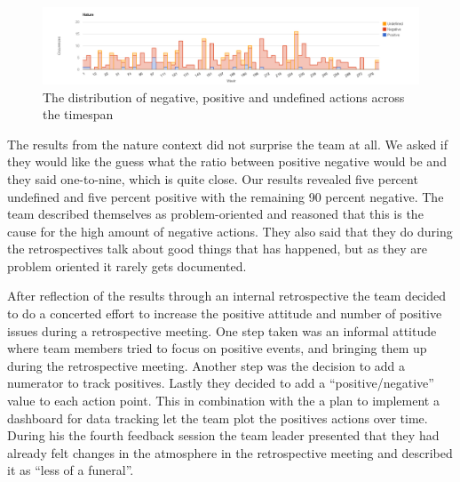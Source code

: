 \begin{table}[!h]
	\begin{center}
	\caption{Analysis results from the content analysis for the nature of the action.}
	\label{table:nature-results}
	\end{center}
\end{table}

\begin{figure}
	\centering
	\includegraphics[width=\textwidth, keepaspectratio]{figures/nature-l.png}
	\caption{The distribution of negative, positive and undefined actions across the timespan}
	\label{figure:nature-l}
\end{figure}

The results from the nature context did not surprise the team at all. We asked if they would like the guess what the ratio between positive negative would be and they said one-to-nine, which is quite close. Our results revealed five percent undefined and five percent positive with the remaining 90 percent negative. The team described themselves as problem-oriented and reasoned that this is the cause for the high amount of negative actions. They also said that they do during the retrospectives talk about good things that has happened, but as they are problem oriented it rarely gets documented. 

After reflection of the results through an internal retrospective the team decided to do a concerted effort to increase the positive attitude and number of positive issues during a retrospective meeting. One step taken was an informal attitude where team members tried to focus on positive events, and bringing them up during the retrospective meeting. Another step was the decision to add a numerator to track positives. Lastly they decided to add a ``positive/negative'' value to each action point. This in combination with the a plan to implement a dashboard for data tracking let the team plot the positives actions over time. During his the fourth feedback session the team leader presented that they had already felt changes in the atmosphere in the retrospective meeting and described it as ``less of a funeral''. 

